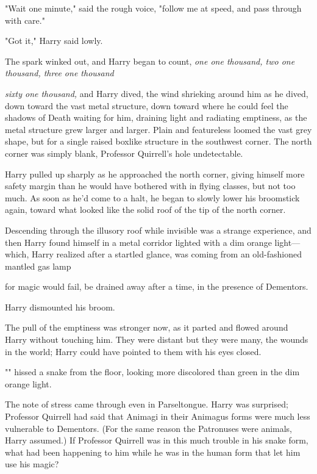 "Wait one minute," said the rough voice, "follow me at speed, and pass through
with care."

"Got it," Harry said lowly.

The spark winked out, and Harry began to count, \emph{one one thousand, two one
thousand, three one thousand{\el}}

\emph{{\el}sixty one thousand,} and Harry dived, the wind shrieking around
him as he dived, down toward the vast metal structure, down toward where he
could feel the shadows of Death waiting for him, draining light and radiating
emptiness, as the metal structure grew larger and larger. Plain and featureless
loomed the vast grey shape, but for a single raised boxlike structure in the
southwest corner. The north corner was simply blank, Professor Quirrell's hole
undetectable.

Harry pulled up sharply as he approached the north corner, giving himself more
safety margin than he would have bothered with in flying classes, but not too
much. As soon as he'd come to a halt, he began to slowly lower his broomstick
again, toward what looked like the solid roof of the tip of the north corner.

Descending through the illusory roof while invisible was a strange experience,
and then Harry found himself in a metal corridor lighted with a dim orange
light—which, Harry realized after a startled glance, was coming from an
old-fashioned mantled gas lamp{\el}

{\el} for magic would fail, be drained away after a time, in the presence of
Dementors.

Harry dismounted his broom.

The pull of the emptiness was stronger now, as it parted and flowed around
Harry without touching him. They were distant but they were many, the wounds in
the world; Harry could have pointed to them with his eyes closed.

"" hissed a snake from the floor, looking more
discolored than green in the dim orange light.

The note of stress came through even in Parseltongue. Harry was surprised;
Professor Quirrell had said that Animagi in their Animagus forms were much less
vulnerable to Dementors. (For the same reason the Patronuses were animals,
Harry assumed.) If Professor Quirrell was in this much trouble in his snake
form, what had been happening to him while he was in the human form that let
him use his magic{\el}?

